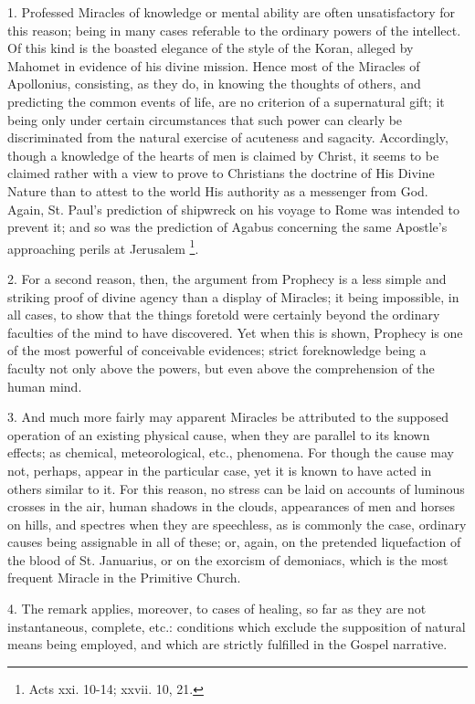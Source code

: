 1. Professed Miracles of knowledge or mental
ability are often unsatisfactory for this reason; being in many cases
referable to the ordinary powers of the intellect. Of this kind is the
boasted elegance of the style of the Koran, alleged by Mahomet in
evidence of his divine mission. Hence most of the Miracles of
Apollonius, consisting, as they do, in knowing the thoughts of others,
and predicting the common events of life, are no criterion of a
supernatural gift; it being only under certain circumstances that such
power can clearly be discriminated from the natural exercise of
acuteness and sagacity. Accordingly, though a knowledge of the hearts
of men is claimed by Christ, it seems to be claimed rather with a view
to prove to Christians the doctrine of His Divine Nature than to
attest to the world His authority as a messenger from God. Again, St.
Paul's prediction of shipwreck on his voyage to Rome was intended to
prevent it; and so was the prediction of Agabus concerning the
same Apostle's approaching perils at Jerusalem \footnote{Acts xxi. 10-14; xxvii. 10, 21.}.

2. For a second reason, then, the argument from
Prophecy is a less simple and striking proof of divine agency than a
display of Miracles; it being impossible, in all cases, to show that
the things foretold were certainly beyond the ordinary faculties of
the mind to have discovered. Yet when this is shown, Prophecy is one
of the most powerful of conceivable evidences; strict foreknowledge
being a faculty not only above the powers, but even above the
comprehension of the human mind.

3. And much more fairly may apparent Miracles be
attributed to the supposed operation of an existing physical cause,
when they are parallel to its known effects; as chemical,
meteorological, etc., phenomena. For though the cause may not,
perhaps, appear in the particular case, yet it is known to have acted
in others similar to it. For this reason, no stress can be laid on
accounts of luminous crosses in the air, human shadows in the clouds,
appearances of men and horses on hills, and spectres when they are
speechless, as is commonly the case, ordinary causes being assignable
in all of these; or, again, on the pretended liquefaction of the blood
of St. Januarius, or on the exorcism of demoniacs, which is the most
frequent Miracle in the Primitive Church.

4. The remark applies, moreover, to cases of
healing, so far as they are not instantaneous, complete, etc.:
conditions which exclude the supposition of natural means being
employed, and which are strictly fulfilled in the Gospel narrative.

